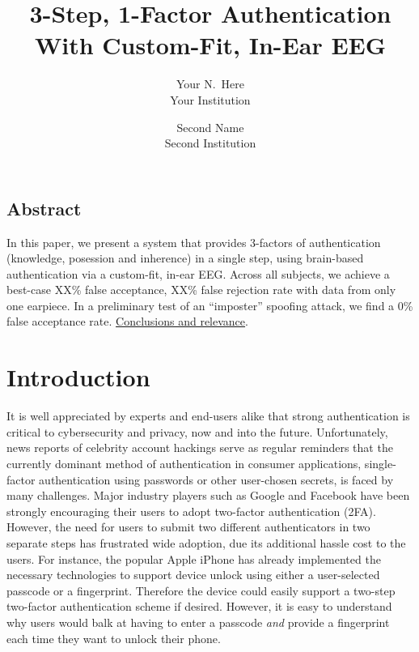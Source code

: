 \documentclass[letterpaper,twocolumn,10pt]{article}
\begin{document}
\date{}

\title{\Large \bf 3-Step, 1-Factor Authentication With Custom-Fit, In-Ear EEG}

\author{
{\rm Your N.\ Here}\\
Your Institution
\and
{\rm Second Name}\\
Second Institution
} %

\maketitle

\thispagestyle{empty}


\subsection*{Abstract}
In this paper, we present a system that provides 3-factors of authentication (knowledge, posession and inherence) in a single step, using brain-based authentication via a custom-fit, in-ear EEG. Across all subjects, we achieve a best-case XX\% false acceptance, XX\% false rejection rate with data from only one earpiece. In a preliminary test of an ``imposter'' spoofing attack, we find a 0\% false acceptance rate. \underline{Conclusions and relevance}.

\section{Introduction}
\label{sec:org7196b99}

It is well appreciated by experts and end-users alike that strong authentication is
critical to cybersecurity and privacy, now and into the future. Unfortunately,
news 
reports of celebrity account hackings serve as regular reminders that
the currently dominant method of authentication in consumer applications, 
single-factor authentication using passwords or other user-chosen secrets, 
is faced by many challenges. Major industry players such as Google and
Facebook have been strongly encouraging their users to adopt two-factor
authentication (2FA). However, the need for users to submit two different 
authenticators in two separate steps has frustrated wide adoption, 
due its additional hassle cost to the users. For instance, the popular Apple
iPhone has already implemented the necessary technologies to support device
unlock using either a user-selected passcode or a fingerprint. Therefore the
device could easily support a two-step two-factor authentication scheme if
desired. However, it is easy to understand why users would balk at having to
enter a passcode \emph{and} provide a fingerprint each time they want to unlock their phone.
\end{document}

